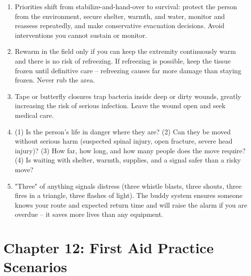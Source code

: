 \begin{enumerate}[leftmargin=*]
\item Priorities shift from stabilize-and-hand-over to survival: protect the person from the environment, secure shelter, warmth, and water, monitor and reassess repeatedly, and make conservative evacuation decisions. Avoid interventions you cannot sustain or monitor.
\item Rewarm in the field only if you can keep the extremity continuously warm and there is no risk of refreezing. If refreezing is possible, keep the tissue frozen until definitive care -- refreezing causes far more damage than staying frozen. Never rub the area.
\item Tape or butterfly closures trap bacteria inside deep or dirty wounds, greatly increasing the risk of serious infection. Leave the wound open and seek medical care.
\item (1) Is the person's life in danger where they are? (2) Can they be moved without serious harm (suspected spinal injury, open fracture, severe head injury)? (3) How far, how long, and how many people does the move require? (4) Is waiting with shelter, warmth, supplies, and a signal safer than a risky move?
\item "Three" of anything signals distress (three whistle blasts, three shouts, three fires in a triangle, three flashes of light). The buddy system ensures someone knows your route and expected return time and will raise the alarm if you are overdue -- it saves more lives than any equipment.
\end{enumerate}

\section*{Chapter 12: First Aid Practice Scenarios}

